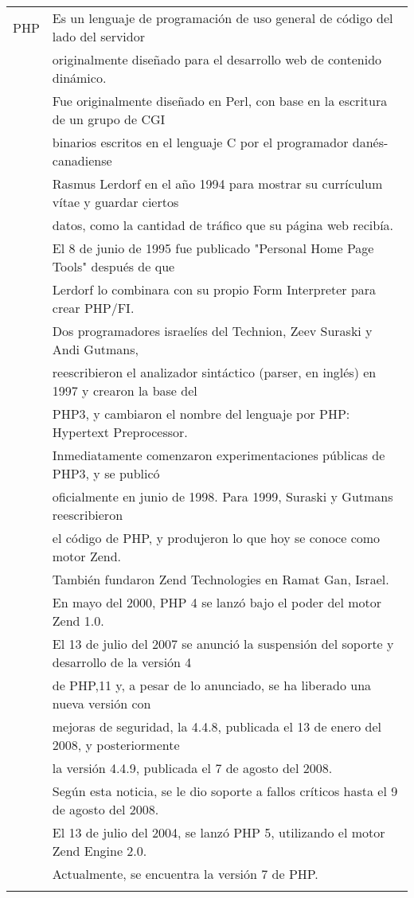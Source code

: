 \documentclass[a4paper,10pt]{article}
\begin{document}
\begin{enumerate}
        \begin{tabular}{r|l}
            \textsc{PHP}
                & Es un lenguaje de programación de uso general de código del lado del servidor \\ 
                & originalmente diseñado para el desarrollo web de contenido dinámico. \\ 
                & Fue originalmente diseñado en Perl, con base en la escritura de un grupo de CGI \\ 
                & binarios escritos en el lenguaje C por el programador danés-canadiense \\ 
                & Rasmus Lerdorf en el año 1994 para mostrar su currículum vítae y guardar ciertos \\ 
                & datos, como la cantidad de tráfico que su página web recibía. \\ 
                & El 8 de junio de 1995 fue publicado "Personal Home Page Tools" después de que \\ 
                & Lerdorf lo combinara con su propio Form Interpreter para crear PHP/FI. \\
                & Dos programadores israelíes del Technion, Zeev Suraski y Andi Gutmans, \\
                & reescribieron el analizador sintáctico (parser, en inglés) en 1997 y crearon la base del \\ 
                & PHP3, y cambiaron el nombre del lenguaje por PHP: Hypertext Preprocessor. \\ 
                & Inmediatamente comenzaron experimentaciones públicas de PHP3, y se publicó \\ 
                & oficialmente en junio de 1998. Para 1999, Suraski y Gutmans reescribieron \\ 
                & el código de PHP, y produjeron lo que hoy se conoce como motor Zend. \\
                & También fundaron Zend Technologies en Ramat Gan, Israel. \\ 
                & En mayo del 2000, PHP 4 se lanzó bajo el poder del motor Zend 1.0. \\
                & El 13 de julio del 2007 se anunció la suspensión del soporte y desarrollo de la versión 4 \\
                & de PHP,11 y, a pesar de lo anunciado, se ha liberado una nueva versión con \\
                & mejoras de seguridad, la 4.4.8, publicada el 13 de enero del 2008, y posteriormente \\ 
                & la versión 4.4.9, publicada el 7 de agosto del 2008. \\ 
                & Según esta noticia, se le dio soporte a fallos críticos hasta el 9 de agosto del 2008. \\
                & El 13 de julio del 2004, se lanzó PHP 5, utilizando el motor Zend Engine 2.0.\\
                & Actualmente, se encuentra la versión 7 de PHP.\\ & \\
                

\end{tabular}
\end{enumerate}
\end{document}
